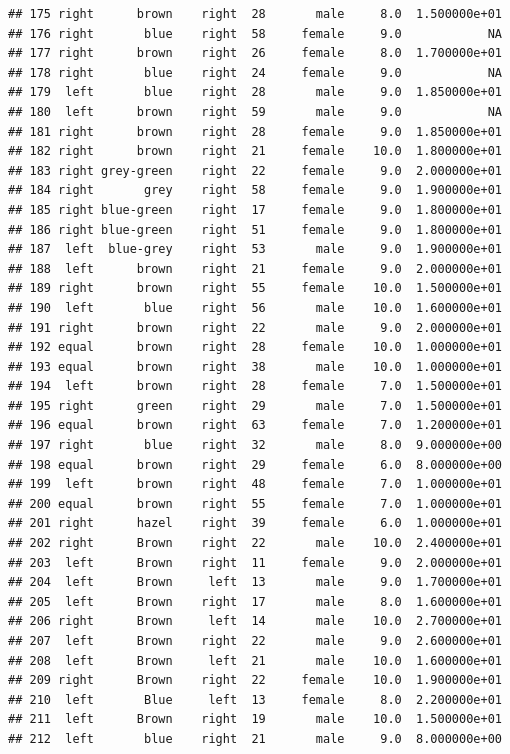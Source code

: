 \documentclass[]{article}
\begin{document}
\begin{verbatim}
## 175 right      brown    right  28       male     8.0  1.500000e+01
## 176 right       blue    right  58     female     9.0            NA
## 177 right      brown    right  26     female     8.0  1.700000e+01
## 178 right       blue    right  24     female     9.0            NA
## 179  left       blue    right  28       male     9.0  1.850000e+01
## 180  left      brown    right  59       male     9.0            NA
## 181 right      brown    right  28     female     9.0  1.850000e+01
## 182 right      brown    right  21     female    10.0  1.800000e+01
## 183 right grey-green    right  22     female     9.0  2.000000e+01
## 184 right       grey    right  58     female     9.0  1.900000e+01
## 185 right blue-green    right  17     female     9.0  1.800000e+01
## 186 right blue-green    right  51     female     9.0  1.800000e+01
## 187  left  blue-grey    right  53       male     9.0  1.900000e+01
## 188  left      brown    right  21     female     9.0  2.000000e+01
## 189 right      brown    right  55     female    10.0  1.500000e+01
## 190  left       blue    right  56       male    10.0  1.600000e+01
## 191 right      brown    right  22       male     9.0  2.000000e+01
## 192 equal      brown    right  28     female    10.0  1.000000e+01
## 193 equal      brown    right  38       male    10.0  1.000000e+01
## 194  left      brown    right  28     female     7.0  1.500000e+01
## 195 right      green    right  29       male     7.0  1.500000e+01
## 196 equal      brown    right  63     female     7.0  1.200000e+01
## 197 right       blue    right  32       male     8.0  9.000000e+00
## 198 equal      brown    right  29     female     6.0  8.000000e+00
## 199  left      brown    right  48     female     7.0  1.000000e+01
## 200 equal      brown    right  55     female     7.0  1.000000e+01
## 201 right      hazel    right  39     female     6.0  1.000000e+01
## 202 right      Brown    right  22       male    10.0  2.400000e+01
## 203  left      Brown    right  11     female     9.0  2.000000e+01
## 204  left      Brown     left  13       male     9.0  1.700000e+01
## 205  left      Brown    right  17       male     8.0  1.600000e+01
## 206 right      Brown     left  14       male    10.0  2.700000e+01
## 207  left      Brown    right  22       male     9.0  2.600000e+01
## 208  left      Brown     left  21       male    10.0  1.600000e+01
## 209 right      Brown    right  22     female    10.0  1.900000e+01
## 210  left       Blue     left  13     female     8.0  2.200000e+01
## 211  left      Brown    right  19       male    10.0  1.500000e+01
## 212  left       blue    right  21       male     9.0  8.000000e+00

\end{verbatim}
\end{document}
